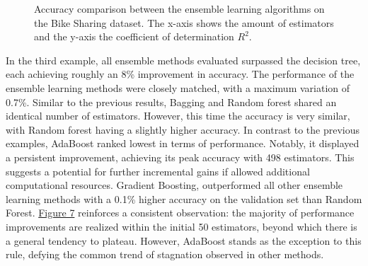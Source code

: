 

\begin{figure}[htbp]
    \centering
    \label{fig:bs_comparison}
    \caption{
        Accuracy comparison between the ensemble learning algorithms on the Bike Sharing dataset.
        The x-axis shows the amount of estimators and the y-axis the coefficient of determination $R^2$.
    }
\end{figure}

In the third example, all ensemble methods evaluated surpassed the decision tree, each achieving roughly an 8\% improvement in accuracy.
The performance of the ensemble learning methods were closely matched, with a maximum variation of 0.7\%.
Similar to the previous results, Bagging and Random forest shared an identical number of estimators. However, this time the 
accuracy is very similar, with Random forest having a slightly higher accuracy.
In contrast to the previous examples, AdaBoost ranked lowest in terms of performance. Notably, it displayed a persistent
improvement, achieving its peak accuracy with 498 estimators. This suggests a potential for further incremental gains if allowed
additional computational resources.
Gradient Boosting, outperformed all other ensemble learning methods with a 0.1\% higher accuracy on the validation set than Random
Forest.
\hyperref[fig:bs_comparison]{Figure 7} reinforces a consistent observation: the majority of performance improvements are realized
within the initial 50 estimators, beyond which there is a general tendency to plateau.
However, AdaBoost stands as the exception to this rule, defying the common trend of stagnation observed in other methods.



